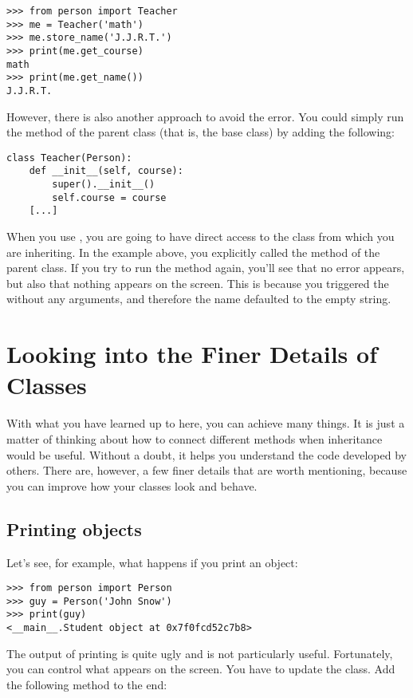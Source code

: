\begin{verbatim}
>>> from person import Teacher
>>> me = Teacher('math')
>>> me.store_name('J.J.R.T.')
>>> print(me.get_course)
math
>>> print(me.get_name())
J.J.R.T.
\end{verbatim}

However, there is also another approach to avoid the error. You could simply run the  method of the parent class (that is, the base class) by adding the following:

\begin{verbatim}
class Teacher(Person):
    def __init__(self, course):
        super().__init__()
        self.course = course
    [...]
\end{verbatim}

When you use , you are going to have direct access to the class from which you are inheriting. In the example above, you explicitly called the  method of the parent class. If you try to run the method  again, you'll see that no error appears, but also that nothing appears on the screen. This is because you triggered the  without any arguments, and therefore the name defaulted to the empty string.


\section{Looking into the Finer Details of Classes}\label{sec:finer-details-of-classes}
With what you have learned up to here, you can achieve many things. It is just a matter of thinking about how to connect different methods when inheritance would be useful. Without a doubt, it helps you understand the code developed by others. There are, however, a few finer details that are worth mentioning, because you can improve how your classes look and behave.

\subsection{Printing objects}\label{subsec:printing-objects}
Let's see, for example, what happens if you print an object:
\begin{verbatim}
>>> from person import Person
>>> guy = Person('John Snow')
>>> print(guy)
<__main__.Student object at 0x7f0fcd52c7b8>
\end{verbatim}
The output of printing  is quite ugly and is not particularly useful. Fortunately, you can control what appears on the screen. You have to update the  class. Add the following method to the end:

